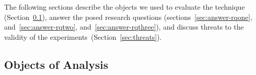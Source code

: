 \documentclass[conference]{IEEEtran}
\begin{document}
The following sections describe the objects we used to evaluate the
technique (Section~\ref{sec:dataset-benign}), answer the posed
research questions (sections~\ref{sec:answer-rqone},
and~\ref{sec:answer-rqtwo}, and~\ref{sec:answer-rqthree}), and
discuss threats to the validity of the
experiments~(Section~\ref{sec:threats}).



\newcommand{\numNonContentAttacks}{4}
\newcommand{\numContentAttacks}{10}

\subsection{Objects of Analysis}
\label{sec:dataset-benign}
\label{attack-reproduction}
\label{subsec:malicious-traffic}
\label{sec:objectanalysis-benign}

\end{document}
